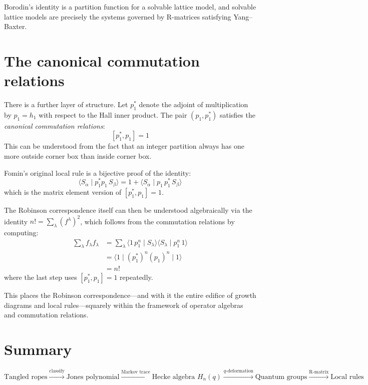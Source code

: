\documentclass[12pt]{article}
\begin{document}
Borodin's identity is a partition function for a solvable lattice model,
and solvable lattice models are precisely the systems governed by R-matrices
satisfying Yang--Baxter.

\section{The canonical commutation relations}

There is a further layer of structure. Let $p_1^*$ denote the adjoint
of multiplication by $p_1 = h_1$ with respect to the Hall inner product.
The pair $(p_1, p_1^*)$ satisfies the \emph{canonical commutation relations}:
\[
  [p_1^*, p_1] = 1
\]
This can be understood from the fact that an integer partition always has
one more outside corner box than inside corner box.

Fomin's original local rule is a bijective proof of the identity:
\[
  \langle S_\alpha \mid p_1^* p_1\, S_\beta \rangle
    = 1 + \langle S_\alpha \mid p_1\, p_1^*\, S_\beta \rangle
\]
which is the matrix element version of $[p_1^*, p_1] = 1$.

The Robinson correspondence itself can then be understood algebraically
via the identity $n! = \sum_\lambda (f^\lambda)^2$, which follows from the
commutation relations by computing:
\begin{align*}
  \sum_\lambda f_\lambda f_\lambda
    &= \sum_\lambda \langle 1\, p_1^n \mid S_\lambda \rangle
       \langle S_\lambda \mid p_1^n\, 1 \rangle \\
    &= \langle 1 \mid (p_1^*)^n (p_1)^n \mid 1 \rangle \\
    &= n!
\end{align*}
where the last step uses $[p_1^*, p_1] = 1$ repeatedly.

This places the Robinson correspondence---and with it the entire edifice
of growth diagrams and local rules---squarely within the framework of
operator algebras and commutation relations.

\section{Summary}

\[
  \boxed{
  \text{Tangled ropes}
  \xrightarrow{\text{classify}}
  \text{Jones polynomial}
  \xrightarrow{\text{Markov trace}}
  \text{Hecke algebra } H_n(q)
  \xrightarrow{\text{$q$-deformation}}
  \text{Quantum groups}
  \xrightarrow{\text{R-matrix}}
  \text{Local rules}
  }
\]
\end{document}
